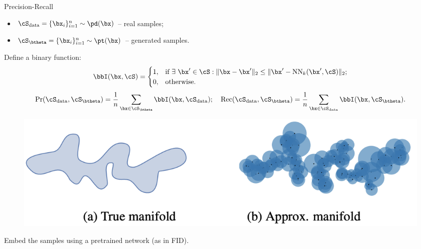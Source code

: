 \documentclass{beamer}
\begin{document}
\begin{frame}{Precision-Recall}
	\vspace{-0.2cm}
	\begin{itemize}
		\item $\cS_{\text{data}} = \{\bx_i\}_{i=1}^{n} \sim \pd(\bx)$ -- real samples;
		\item $\cS_{\btheta} = \{\bx_i\}_{i=1}^{n} \sim \pt(\bx)$ -- generated samples.
	\end{itemize}
	\eqpause
	Define a binary function:
	\vspace{-0.2cm}
	\[
		\bbI(\bx, \cS) =
		\begin{cases}
			1, & \text{if } \exists\ \bx' \in \cS: \| \bx - \bx'\|_2 \leq \| \bx' - \text{NN}_k(\bx', \cS)\|_2; \\
			0, & \text{otherwise.}
		\end{cases}
	\]
	\eqpause
	\vspace{-0.3cm}
	\[
		\text{Pr} (\cS_{\text{data}}, \cS_{\btheta}) = \frac{1}{n} \sum_{\bx \in \cS_{\btheta}} \bbI(\bx, \cS_{\text{data}}); \quad \text{Rec} (\cS_{\text{data}}, \cS_{\btheta}) = \frac{1}{n} \sum_{\bx \in \cS_{\text{data}}} \bbI(\bx, \cS_{\btheta}).
	\]
	\eqpause
	\vspace{-0.6cm}
	\begin{figure}
		\includegraphics[width=0.75\linewidth]{figs/pr_k_nearest}
	\end{figure}
	\eqpause
	Embed the samples using a pretrained network (as in FID).
\end{frame}
\end{document}
